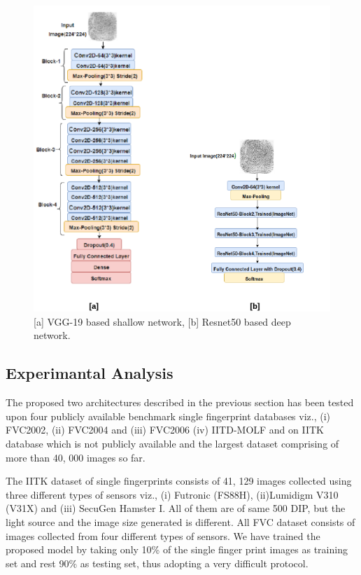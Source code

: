 \documentclass[12pt, a4paper,twoside]{article}
\begin{document}
\begin{figure}[htbp]
\centering
\includegraphics[scale=0.8]{images/ModelDiagram}
\caption{ [a] VGG-19 based shallow network, [b] Resnet50 based deep network.
}\label{fig:figure7}
\end{figure} 

\subsection{Experimantal Analysis}
\label{sec:expAnalysis}

	The proposed two architectures described in the previous section has been tested upon four publicly available benchmark single fingerprint databases viz., (i) FVC2002, (ii) FVC2004 and (iii) FVC2006 (iv) IITD-MOLF and on IITK database which is not publicly available and the largest dataset comprising of more than 40, 000 images so far.
	
	The IITK dataset of single fingerprints consists of 41, 129 images collected using three different types of sensors viz., (i) Futronic (FS88H), (ii)Lumidigm V310 (V31X) and (iii) SecuGen Hamster I. All of them are of same 500 DIP, but the light source and the image size generated is different. All FVC dataset consists of images collected from four different types of sensors. We have trained the proposed model by taking only 10\% of the single finger print images as training set and rest 90\% as testing set, thus adopting a very difficult protocol.
	
\end{document}
